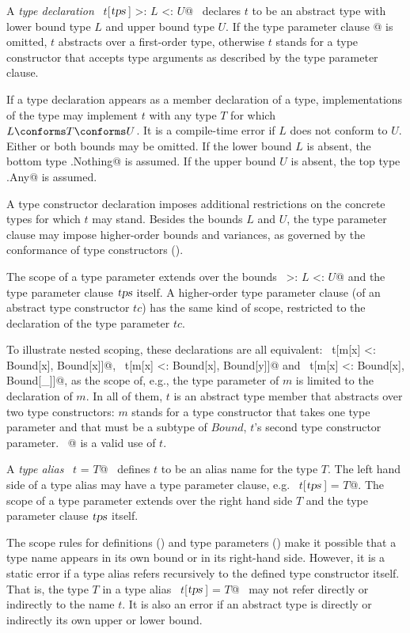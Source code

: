 A {\em type declaration} ~\lstinline@type $t$[$\tps\,$] >: $L$ <: $U$@~ declares
$t$ to be an abstract type with lower bound type $L$ and upper bound
type $U$. If the type parameter clause \lstinline@[$\tps\,$]@ is omitted, $t$ abstracts over a first-order type, otherwise $t$ stands for a type constructor that accepts type arguments as described by the type parameter clause.

If a type declaration appears as a member declaration of a
type, implementations of the type may implement $t$ with any type $T$
for which $L \conforms T \conforms U$. It is a compile-time error if
$L$ does not conform to $U$.  Either or both bounds may be omitted.
If the lower bound $L$ is absent, the bottom type
\lstinline@scala.Nothing@ is assumed.  If the upper bound $U$ is absent,
the top type \lstinline@scala.Any@ is assumed.

A type constructor declaration imposes additional restrictions on the
concrete types for which $t$ may stand. Besides the bounds $L$ and
$U$, the type parameter clause may impose higher-order bounds and
variances, as governed by the conformance of type constructors
().

The scope of a type parameter extends over the bounds ~\lstinline@>: $L$ <: $U$@ and the type parameter clause $\mbox{\sl tps}$ itself. A
higher-order type parameter clause (of an abstract type constructor
$tc$) has the same kind of scope, restricted to the declaration of the
type parameter $tc$.

To illustrate nested scoping, these declarations are all equivalent: ~\lstinline@type t[m[x] <: Bound[x], Bound[x]]@, ~\lstinline@type t[m[x] <: Bound[x], Bound[y]]@ and ~\lstinline@type t[m[x] <: Bound[x], Bound[_]]@, as the scope of, e.g., the type parameter of $m$ is limited to the declaration of $m$. In all of them, $t$ is an abstract type member that abstracts over two type constructors: $m$ stands for a type constructor that takes one type parameter and that must be a subtype of $Bound$, $t$'s second type constructor parameter. ~@ is a valid use of $t$.

A {\em type alias} ~\lstinline@type $t$ = $T$@~ defines $t$ to be an alias
name for the type $T$.  The left hand side of a type alias may
have a type parameter clause, e.g. ~\lstinline@type $t$[$\tps\,$] = $T$@.  The scope
of a type parameter extends over the right hand side $T$ and the
type parameter clause $\mbox{\sl tps}$ itself.  

The scope rules for definitions () and type parameters
() make it possible that a type name appears in its
own bound or in its right-hand side.  However, it is a static error if
a type alias refers recursively to the defined type constructor itself.  
That is, the type $T$ in a type alias ~\lstinline@type $t$[$\tps\,$] = $T$@~ may not 
refer directly or indirectly to the name $t$.  It is also an error if
an abstract type is directly or indirectly its own upper or lower bound.

